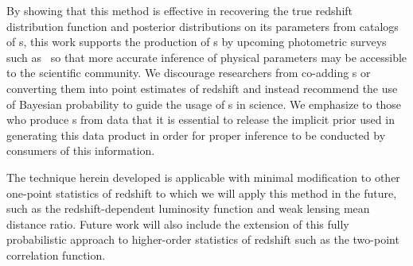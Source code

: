 
By showing that this method is effective in recovering the true redshift distribution function and posterior distributions on its parameters from catalogs of \pzpdf s, this work supports the production of \pzpdf s by upcoming photometric surveys such as \lsst\ so that more accurate inference of physical parameters may be accessible to the scientific community.  
We discourage researchers from co-adding \pzpdf s or converting them into point estimates of redshift and instead recommend the use of Bayesian probability to guide the usage of \pzpdf s in science.  
We emphasize to those who produce \pzpdf s from data that it is essential to release the implicit prior used in generating this data product in order for proper inference to be conducted by consumers of this information.

The technique herein developed is applicable with minimal modification to other one-point statistics of redshift to which we will apply this method in the future, such as the redshift-dependent luminosity function and weak lensing mean distance ratio.  
Future work will also include the extension of this fully probabilistic approach to higher-order statistics of redshift such as the two-point correlation function.

